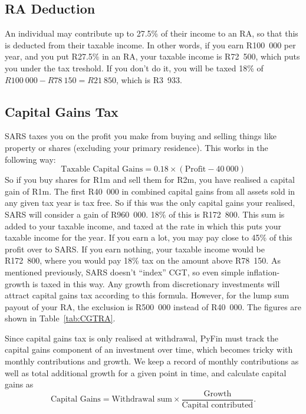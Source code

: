 \documentclass[a4paper, justified]{tufte-handout}
\begin{document}
\subsection{RA Deduction}
An individual may contribute up to 27.5\% of their income to an RA, so that this is deducted from their taxable income. In other words, if you earn R100~000 per year, and you put R27.5\% in an RA, your taxable income is R72~500, which puts you under the tax treshold. If you don't do it, you will be taxed 18\% of $R100~000-R78~150 = R21~850$, which is R3~933.

\subsection{Capital Gains Tax}
SARS taxes you on the profit you make from buying and selling things like property or shares (excluding your primary residence).
This works in the following way:
\begin{equation} \label{eq:CGT}
\textrm{Taxable Capital Gains} = 0.18\times(\textrm{Profit} - 40~000)
\end{equation}
So if you buy shares for R1m and sell them for R2m, you have realised a capital gain of R1m. The first R40~000 in combined capital gains from all assets sold in any given tax year is tax free. So if this was the only capital gains your realised, SARS will consider a gain of R960~000. 18\% of this is R172~800. This sum is added to your taxable income, and taxed at the rate in which this puts your taxable income for the year. If you earn a lot, you may pay close to 45\% of this profit over to SARS. If you earn nothing, your taxable income would be R172~800, where you would pay 18\% tax on the amount above R78~150. As mentioned previously, SARS doesn't ``index'' CGT, so even simple inflation-growth is taxed in this way. Any growth from discretionary investments will attract capital gains tax according to this formula. However, for the lump sum payout of your RA, the exclusion is R500~000 instead of R40~000. The figures are shown in Table~\ref{tab:CGTRA}.

Since capital gains tax is only realised at withdrawal, PyFin must track the capital gains component of an investment over time, which becomes tricky with monthly contributions and growth. We keep a record of monthly contributions as well as total additional growth for a given point in time, and calculate capital gains as
\begin{equation}
\textrm{Capital Gains} = \textrm{Withdrawal sum}\times\frac{\textrm{Growth}}{\textrm{Capital contributed}}.
\end{equation}
\end{document}
